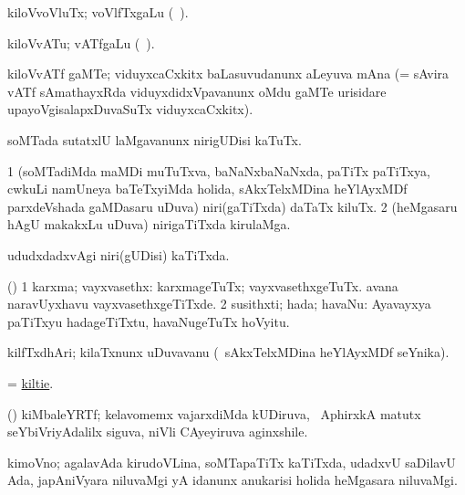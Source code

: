 \bentry
{}
\gl{\nA}
\bmng
kiloVvoVluTx;  voVlfTxgaLu (\saMkiSx\ ). 
\emng
\eentry

\bentry
{}
\gl{\nA}
\bmng
kiloVvATu;  vATfgaLu (\saMkiSx\ ). 
\emng
\eentry

\bentry
{}
\gl{\nA}
\bmng
kiloVvATf gaMTe; viduyxcaCxkitx baLasuvudanunx aLeyuva mAna (= sAvira vATf sAmathayxRda viduyxdidxVpavanunx oMdu gaMTe urisidare upayoVgisalapxDuvaSuTx viduyxcaCxkitx). 
\emng
\eentry

\bentry
{}
\gl{\sakirx}
\bmng
soMTada sutatxlU laMgavanunx nirigUDisi kaTuTx. 
\emng
\eentry

\bentry
{}
\gl{\nA}
\bmng
\bnum
\num{1} (soMTadiMda maMDi muTuTxva, baNaNxbaNaNxda, paTiTx paTiTxya, cwkuLi namUneya baTeTxyiMda holida, sAkxTelxMDina heYlAyxMDf parxdeVshada gaMDasaru uDuva) niri(gaTiTxda) daTaTx kiluTx. 
\num{2} (heMgasaru hAgU makakxLu uDuva) nirigaTiTxda kirulaMga.   
\enum
\emng
\eentry

\bentry
{}
\gl{\gu}
\bmng
ududxdadxvAgi niri(gUDisi) kaTiTxda. 
\emng
\eentry

\bentry
{}
\gl{\nA}
\bmng
(\ame) 
\bnum
\num{1} karxma; vayxvasethx:  karxmageTuTx; vayxvasethxgeTuTx.  avana naravUyxhavu vayxvasethxgeTiTxde. 
\num{2} susithxti; hada; havaNu:  Ayavayxya paTiTxyu hadageTiTxtu, havaNugeTuTx hoVyitu. 
\enum
\emng
\eentry

\bentry
{}
\gl{\nA}
\bmng
kilfTxdhAri; kilaTxnunx uDuvavanu (\kanmu\ sAkxTelxMDina heYlAyxMDf seYnika). 
\emng
\eentry

\bentry
{}
\gl{\nA}
\bmng
 = \hyperlink{kiltie}{kiltie}. 
\emng
\eentry

\bentry
{}
\gl{\nA}
\bmng
(\Kani) kiMbaleYRTf; kelavomemx vajarxdiMda kUDiruva, \da\ AphirxkA matutx seYbiVriyAdalilx siguva, niVli CAyeyiruva aginxshile. 
\emng
\eentry

\bentry
{}
\gl{\nA}
\bmng
kimoVno; agalavAda kirudoVLina, soMTapaTiTx kaTiTxda, udadxvU saDilavU Ada, japAniVyara niluvaMgi yA idanunx anukarisi holida heMgasara niluvaMgi.   
\emng
\eentry

